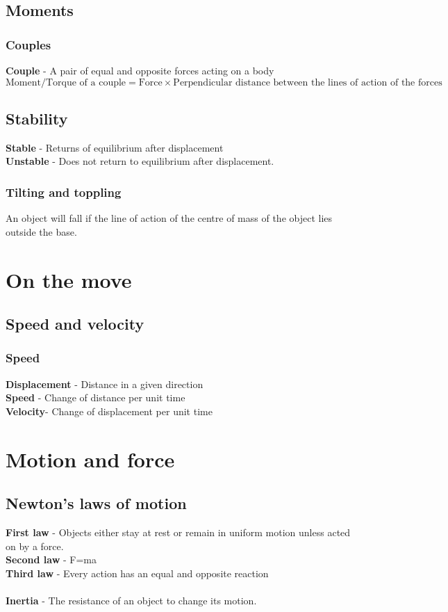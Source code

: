 \documentclass{article}[18pt]
\begin{document}
\subsection{Moments}
\subsubsection{Couples}
\textbf{Couple} - A pair of equal and opposite forces acting on a body\\
$$\text{Moment/Torque of a couple}=\text{Force}\times\text{Perpendicular distance between the lines of action of the forces}$$
\subsection{Stability}
\textbf{Stable} - Returns of equilibrium after displacement\\
\textbf{Unstable} - Does not return to equilibrium after displacement.
\subsubsection{Tilting and toppling}
An object will fall if the line of action of the centre of mass of the object lies outside the base.
\section{On the move}
\subsection{Speed and velocity}
\subsubsection{Speed}
\textbf{Displacement} - Distance in a given direction\\
\textbf{Speed} - Change of distance per unit time\\
\textbf{Velocity}- Change of displacement per unit time\\
\section{Motion and force}
\subsection{Newton's laws of motion}
\textbf{First law} - Objects either stay at rest or remain in uniform motion unless acted on by a force.\\
\textbf{Second law} - F=ma\\
\textbf{Third law} - Every action has an equal and opposite reaction\\
\\
\textbf{Inertia} - The resistance of an object to change its motion.
\end{document}
